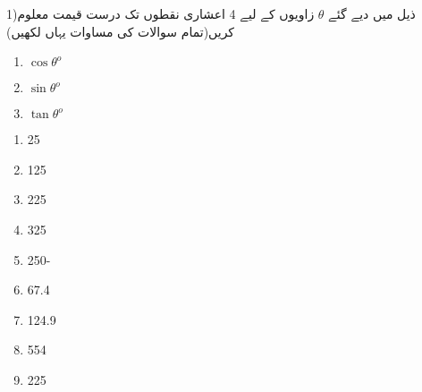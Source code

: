                                                                       \quad \quad \quad  \quad    \quad    \quad    \quad \quad   \quad                                 {}

1)ذیل میں دیے گئے \(\theta\)  زاویوں کے لیے  4 اعشاری نقطوں تک درست قیمت معلوم کریں(تمام سوالات کی مساوات یہاں لکھیں)

\begin{multicols}{3}
\begin{enumerate}[iـ]
\item \( \cos \theta^o\)

\item \(\sin \theta^o\)

\item \(\tan \theta^o\)

\end{enumerate}
\end{multicols}

\begin{multicols}{4}
\begin{enumerate}[aـ]
\item 25

\item 125

\item 225

\item 325

\item 250-

\item 67.4

\item 124.9

\item 554

\item 225

\end{enumerate}
\end{multicols}



